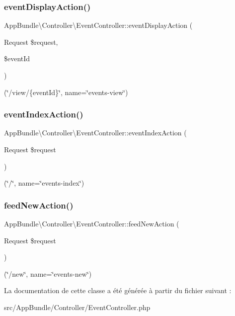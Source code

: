 \subsubsection{\texorpdfstring{event\+Display\+Action()}{eventDisplayAction()}}
{\footnotesize\ttfamily App\+Bundle\textbackslash{}\+Controller\textbackslash{}\+Event\+Controller\+::event\+Display\+Action (\begin{DoxyParamCaption}\item[{Request}]{\$request,  }\item[{}]{\$event\+Id }\end{DoxyParamCaption})}

(\char`\"{}/view/\{event\+Id\}\char`\"{}, name=\char`\"{}events-\/view\char`\"{}) \mbox{\label{classAppBundle_1_1Controller_1_1EventController_a411287cd2df1b0571ac661d44a96b4be}} 
\subsubsection{\texorpdfstring{event\+Index\+Action()}{eventIndexAction()}}
{\footnotesize\ttfamily App\+Bundle\textbackslash{}\+Controller\textbackslash{}\+Event\+Controller\+::event\+Index\+Action (\begin{DoxyParamCaption}\item[{Request}]{\$request }\end{DoxyParamCaption})}

(\char`\"{}/\char`\"{}, name=\char`\"{}events-\/index\char`\"{}) \mbox{\label{classAppBundle_1_1Controller_1_1EventController_a31fbe84d7d41895928d28d9caca6cb07}} 
\subsubsection{\texorpdfstring{feed\+New\+Action()}{feedNewAction()}}
{\footnotesize\ttfamily App\+Bundle\textbackslash{}\+Controller\textbackslash{}\+Event\+Controller\+::feed\+New\+Action (\begin{DoxyParamCaption}\item[{Request}]{\$request }\end{DoxyParamCaption})}

(\char`\"{}/new\char`\"{}, name=\char`\"{}events-\/new\char`\"{}) 

La documentation de cette classe a été générée à partir du fichier suivant \+:\begin{DoxyCompactItemize}
\item 
src/\+App\+Bundle/\+Controller/Event\+Controller.\+php\end{DoxyCompactItemize}
